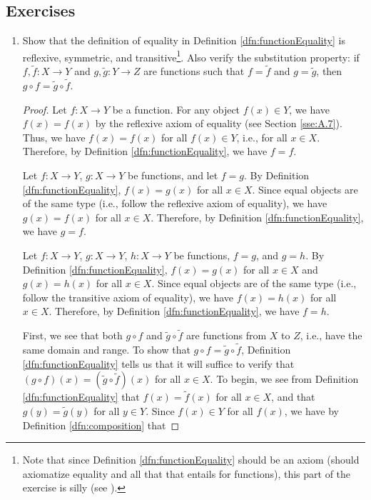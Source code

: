 \documentclass[../main.tex]{subfiles}
\begin{document}
\subsection*{Exercises}
\begin{enumerate}[ref={\thesection.\arabic*}]
    \item \label{exr:3.3.1}Show that the definition of equality in Definition \ref{dfn:functionEquality} is reflexive, symmetric, and transitive\footnote{Note that since Definition \ref{dfn:functionEquality} should be an axiom (should axiomatize equality and all that that entails for functions), this part of the exercise is silly (see \cite{bib:TaoErrata}).}. Also verify the substitution property: if $f,\tilde{f}:X\to Y$ and $g,\tilde{g}:Y\to Z$ are functions such that $f=\tilde{f}$ and $g=\tilde{g}$, then $g\circ f=\tilde{g}\circ\tilde{f}$.
    \begin{proof}
        Let $f:X\to Y$ be a function. For any object $f(x)\in Y$, we have $f(x)=f(x)$ by the reflexive axiom of equality (see Section \ref{sse:A.7}). Thus, we have $f(x)=f(x)$ for all $f(x)\in Y$, i.e., for all $x\in X$. Therefore, by Definition \ref{dfn:functionEquality}, we have $f=f$.\par
        Let $f:X\to Y$, $g:X\to Y$ be functions, and let $f=g$. By Definition \ref{dfn:functionEquality}, $f(x)=g(x)$ for all $x\in X$. Since equal objects are of the same type (i.e., follow the reflexive axiom of equality), we have $g(x)=f(x)$ for all $x\in X$. Therefore, by Definition \ref{dfn:functionEquality}, we have $g=f$.\par
        Let $f:X\to Y$, $g:X\to Y$, $h:X\to Y$ be functions, $f=g$, and $g=h$. By Definition \ref{dfn:functionEquality}, $f(x)=g(x)$ for all $x\in X$ and $g(x)=h(x)$ for all $x\in X$. Since equal objects are of the same type (i.e., follow the transitive axiom of equality), we have $f(x)=h(x)$ for all $x\in X$. Therefore, by Definition \ref{dfn:functionEquality}, we have $f=h$.\par
        First, we see that both $g\circ f$ and $\tilde{g}\circ\tilde{f}$ are functions from $X$ to $Z$, i.e., have the same domain and range. To show that $g\circ f=\tilde{g}\circ\tilde{f}$, Definition \ref{dfn:functionEquality} tells us that it will suffice to verify that $(g\circ f)(x)=(\tilde{g}\circ\tilde{f})(x)$ for all $x\in X$. To begin, we see from Definition \ref{dfn:functionEquality} that $f(x)=\tilde{f}(x)$ for all $x\in X$, and that $g(y)=\tilde{g}(y)$ for all $y\in Y$. Since $f(x)\in Y$ for all $f(x)$, we have by Definition \ref{dfn:composition} that

\end{proof}
\end{enumerate}
\end{document}
